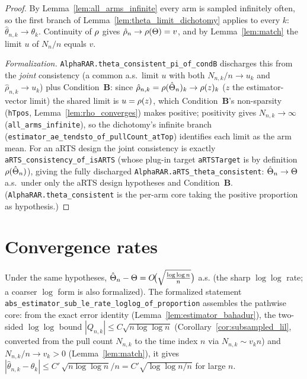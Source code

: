 \begin{proof}\leanok
{}
By Lemma~\ref{lem:all_arms_infinite} every arm is sampled infinitely often, so
the first branch of Lemma~\ref{lem:theta_limit_dichotomy} applies to every $k$:
$\hat{\theta}_{n,k}\to\theta_k$. Continuity of $\rho$ gives
$\hat{\rho}_n\to\rho(\Theta)=v$, and by Lemma~\ref{lem:match} the limit $u$ of
$N_n/n$ equals $v$.

\emph{Formalization.} \texttt{AlphaRAR.theta\_consistent\_pi\_of\_condB} discharges this from the
\emph{joint} consistency (a common a.s.\ limit $u$ with both $N_{n,k}/n\to u_k$ and
$\hat\rho_{n,k}\to u_k$) plus Condition~\textbf{B}: since $\hat\rho_{n,k}=\rho(\hat{\Theta}_n)_k\to
\rho(z)_k$ ($z$ the estimator-vector limit) the shared limit is $u=\rho(z)$, which
Condition~\textbf{B}'s non-sparsity (\texttt{hTpos}, Lemma~\ref{lem:rho_converges}) makes positive;
positivity gives $N_{n,k}\to\infty$ (\texttt{all\_arms\_infinite}), so the dichotomy's infinite branch
(\texttt{estimator\_ae\_tendsto\_of\_pullCount\_atTop}) identifies each limit as the arm mean. For an
aRTS design the joint consistency is exactly \texttt{aRTS\_consistency\_of\_isARTS} (whose plug-in
target \texttt{aRTSTarget} is by definition $\rho(\hat{\Theta}_n)$), giving the fully discharged
\texttt{AlphaRAR.aRTS\_theta\_consistent}: $\hat{\Theta}_n\to\Theta$ a.s.\ under only the aRTS design
hypotheses and Condition~\textbf{B}. (\texttt{AlphaRAR.theta\_consistent} is the per-arm core taking
the positive proportion as hypothesis.)
\end{proof}

\section{Convergence rates}
\label{sec:cons_rates}

\begin{lemma}\label{lem:theta_LIL}
\leanok
{}
Under the same hypotheses,
$\hat{\Theta}_n - \Theta = O\!\big(\sqrt{\tfrac{\log\log n}{n}}\big)$ a.s. (the sharp $\log\log$ rate;
a coarser $\log$ form is also formalized). The formalized statement
\texttt{abs\_estimator\_sub\_le\_rate\_loglog\_of\_proportion} assembles the pathwise core: from the
exact error identity (Lemma~\ref{lem:estimator_bahadur}), the two-sided $\log\log$ bound
$|Q_{n,k}|\le C\sqrt{n\log\log n}$ (Corollary~\ref{cor:subsampled_lil}, converted from the pull count
$N_{n,k}$ to the time index $n$ via $N_{n,k}\sim v_k n$) and $N_{n,k}/n\to v_k>0$
(Lemma~\ref{lem:match}), it gives $|\hat\theta_{n,k}-\theta_k|\le C'\,\sqrt{n\log\log n}/n =
C'\sqrt{\log\log n/n}$ for large $n$.
\end{lemma}

